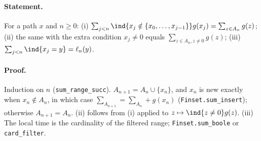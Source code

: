 \paragraph{Statement.} For a path $x$ and $n\geq0$: (i) $\sum_{j<n}\ind\{x_j\notin\{x_0,\dots,x_{j-1}\}\}g(x_j)=\sum_{z\in A_n}g(z)$;
(ii) the same with the extra condition $x_j\neq0$ equals $\sum_{z\in A_n,z\neq0}g(z)$;
(iii) $\sum_{j<n}\ind\{x_j=y\}=\ell_n(y)$.
\paragraph{Proof.} Induction on $n$ (\texttt{sum\_range\_succ}). $A_{n+1}=A_n\cup\{x_n\}$, and $x_n$ is new exactly
when $x_n\notin A_n$, in which case $\sum_{A_{n+1}}=\sum_{A_n}+g(x_n)$ (\texttt{Finset.sum\_insert}); otherwise
$A_{n+1}=A_n$. (ii) follows from (i) applied to $z\mapsto\ind\{z\neq0\}g(z)$. (iii) The local time is the
cardinality of the filtered range; \texttt{Finset.sum\_boole} or \texttt{card\_filter}.
